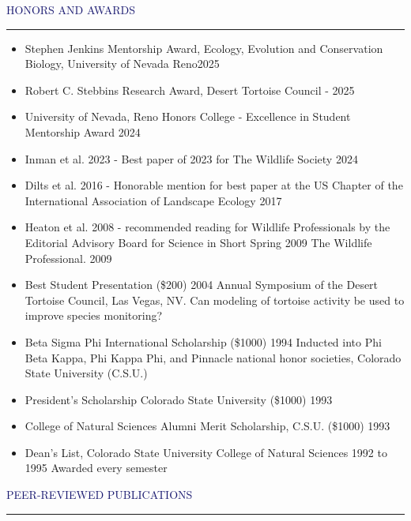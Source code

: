 \documentclass{resume} %
\renewenvironment{rSection}[1]{
\sectionskip
\textcolor{MidnightBlue}{\MakeUppercase{#1}}
\sectionlineskip
\hrule
\begin{list}{}{
\setlength{\leftmargin}{1.5em}
}
\item[]
}{
\end{list}
}
\begin{document}
\begin{rSection}{Honors and Awards}{}
\begin{itemize}
\item Stephen Jenkins Mentorship Award, Ecology, Evolution and Conservation Biology, University of Nevada Reno\hfill 2025
\item Robert C. Stebbins Research Award,  Desert Tortoise Council - \hfill 2025
\item University of Nevada, Reno Honors College - Excellence in Student Mentorship Award \hfill 2024
\item Inman et al. 2023 - Best paper of 2023 for The Wildlife Society \hfill 2024
\item Dilts et al. 2016 - Honorable mention for best paper at the US Chapter of the International Association of Landscape Ecology \hfill 2017
\item Heaton et al. 2008 - recommended reading for Wildlife Professionals by the Editorial Advisory Board for Science in Short Spring 2009 The Wildlife Professional. \hfill 2009
\item Best Student Presentation (\$200) \hfill 2004
Annual Symposium of the Desert Tortoise Council, Las Vegas, NV. Can modeling of tortoise activity be used to improve species monitoring?
\item Beta Sigma Phi International Scholarship (\$1000) \hfill
1994 
Inducted into Phi Beta Kappa, Phi Kappa Phi, and Pinnacle national honor societies, Colorado State University (C.S.U.)
\item President's Scholarship Colorado State University (\$1000) \hfill 1993 
\item College of Natural Sciences Alumni Merit Scholarship, C.S.U. (\$1000) \hfill 1993 
\item Dean's List, Colorado State University College of Natural Sciences \hfill 1992 to 1995
Awarded every semester
\end{itemize}

\end{rSection}

\begin{rSection}{Peer-reviewed Publications}
\begin{refsection}[bibdb]
\nocite{*}
\printbibliography[type=article,heading=subbibliography,title={Journal Articles}, prenote=janote,keyword={journal}]
\printbibliography[heading={subbibliography},title={Book Chapters},type=incollection,keyword={book}]
\end{refsection}

\begin{refsection}[bibdb]
\nocite{*}
\printbibliography[heading={subbibliography},title={Technical Reports - \textit{Peer Reviewed}},keyword={report}]
\end{refsection}

\end{rSection}
\end{document}
